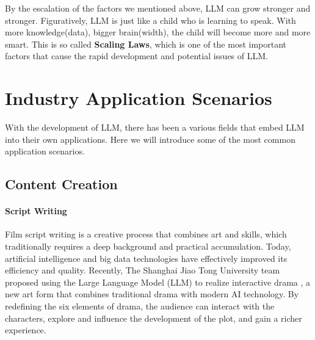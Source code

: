 \documentclass[fleqn,10pt]{SelfArx} %
\begin{document}
By the escalation of the factors we mentioned above, LLM can grow stronger and stronger. Figuratively, LLM is just like a child who is learning to speak. With more knowledge(data), bigger brain(width), the child will become more and more smart. This is so called \textbf{Scaling Laws}, which is one of the most important factors that cause the rapid development and potential issues of LLM.









\section{Industry Application Scenarios}

With the development of LLM, there has been a various fields that embed LLM into their own applications. Here we will introduce some of the most common application scenarios.

\subsection{Content Creation}

\paragraph{Script Writing} Film script writing is a creative process that combines art and skills, which traditionally requires a deep background and practical accumulation. Today, artificial intelligence and big data technologies have effectively improved its efficiency and quality. Recently, The Shanghai Jiao Tong University team proposed using the Large Language Model (LLM) to realize interactive drama \cite{wu2024roleplay}, a new art form that combines traditional drama with modern AI technology. By redefining the six elements of drama, the audience can interact with the characters, explore and influence the development of the plot, and gain a richer experience.
\end{document}

